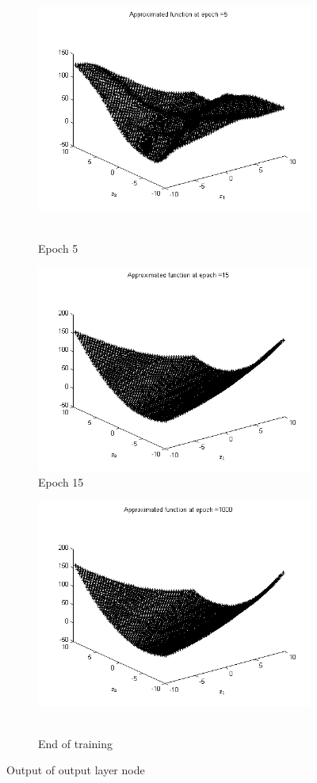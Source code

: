 \documentclass{article}
\begin{document}
\begin{figure}
  \begin{subfigure}{.5\textwidth}
  \centering
  \includegraphics[width=.8\linewidth]{Regression/bivariate/1layer_epoch_5.png}\
  \caption{Epoch 5}
\end{subfigure}%
\begin{subfigure}{.5\textwidth}
  \centering
  \includegraphics[width=.8\linewidth]{Regression/bivariate/1layer_epoch_15.png}
   \caption{Epoch 15}
  \end{subfigure}
  
  \begin{subfigure}{.5\textwidth}
  \centering
  \includegraphics[width=.8\linewidth]{Regression/bivariate/1layer_epoch_1000.png}\
  \caption{End of training}
\end{subfigure}%
  
\caption{Output of output layer node}
\end{figure}
\end{document}
